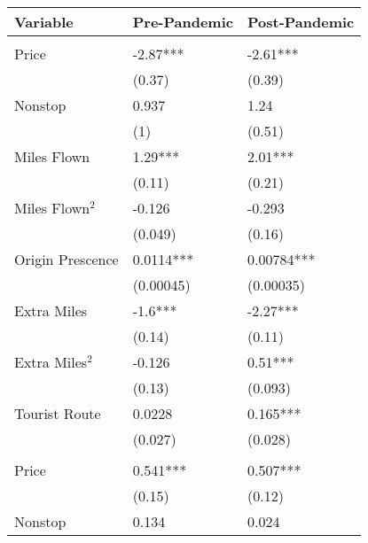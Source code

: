 
\begin{tabular}[t]{lll}
\toprule
Variable & Pre-Pandemic & Post-Pandemic\\
\midrule
\addlinespace[0.3em]
\multicolumn{3}{l}{\textbf{Linear Coefficients}}\\
\hspace{1em}Price & -2.87*** & -2.61***\\
\hspace{1em} & (0.37) & (0.39)\\
\hspace{1em}Nonstop & 0.937 & 1.24\\
\hspace{1em} & (1) & (0.51)\\
\hspace{1em}Miles Flown & 1.29*** & 2.01***\\
\hspace{1em} & (0.11) & (0.21)\\
\hspace{1em}Miles Flown$^2$ & -0.126 & -0.293\\
\hspace{1em} & (0.049) & (0.16)\\
\hspace{1em}Origin Prescence & 0.0114*** & 0.00784***\\
\hspace{1em} & (0.00045) & (0.00035)\\
\hspace{1em}Extra Miles & -1.6*** & -2.27***\\
\hspace{1em} & (0.14) & (0.11)\\
\hspace{1em}Extra Miles$^2$ & -0.126 & 0.51***\\
\hspace{1em} & (0.13) & (0.093)\\
\hspace{1em}Tourist Route & 0.0228 & 0.165***\\
\hspace{1em} & (0.027) & (0.028)\\
\midrule
\addlinespace[0.3em]
\multicolumn{3}{l}{\textbf{Nonlinear Coefficients}}\\
\hspace{1em}Price & 0.541*** & 0.507***\\
\hspace{1em} & (0.15) & (0.12)\\
\hspace{1em}Nonstop & 0.134 & 0.024\\

\end{tabular}

